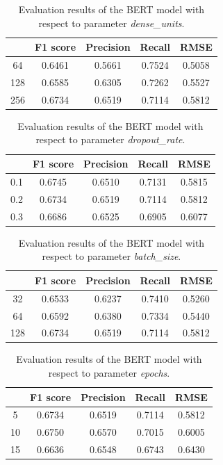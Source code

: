 \documentclass[11pt,a4paper]{article}
\begin{document}
\begin{table}[h]
\centering
\begin{tabular}{ccccc}
    & F1 score & Precision & Recall & RMSE   \\ \hline
64  & 0.6461   & 0.5661    & 0.7524 & 0.5058 \\
128 & 0.6585   & 0.6305    & 0.7262 & 0.5527 \\
256 & 0.6734   & 0.6519    & 0.7114 & 0.5812
\end{tabular}
\caption{Evaluation results of the BERT model with respect to parameter \textit{dense\_units}.}
\label{tab:bert-results-3}
\end{table}

\begin{table}[h]
\centering
\begin{tabular}{ccccc}
    & F1 score & Precision & Recall & RMSE   \\ \hline
0.1 & 0.6745   & 0.6510    & 0.7131 & 0.5815 \\
0.2 & 0.6734   & 0.6519    & 0.7114 & 0.5812 \\
0.3 & 0.6686   & 0.6525    & 0.6905 & 0.6077
\end{tabular}
\caption{Evaluation results of the BERT model with respect to parameter \textit{dropout\_rate}.}
\label{tab:bert-results-4}
\end{table}

\begin{table}[h]
\centering
\begin{tabular}{ccccc}
    & F1 score & Precision & Recall & RMSE   \\ \hline
32  & 0.6533   & 0.6237    & 0.7410 & 0.5260 \\
64  & 0.6592   & 0.6380    & 0.7334 & 0.5440 \\
128 & 0.6734   & 0.6519    & 0.7114 & 0.5812
\end{tabular}
\caption{Evaluation results of the BERT model with respect to parameter \textit{batch\_size}.}
\label{tab:bert-results-5}
\end{table}

\begin{table}[h]
\centering
\begin{tabular}{ccccc}
   & F1 score & Precision & Recall & RMSE   \\ \hline
5  & 0.6734   & 0.6519    & 0.7114 & 0.5812 \\
10 & 0.6750   & 0.6570    & 0.7015 & 0.6005 \\
15 & 0.6636   & 0.6548    & 0.6743 & 0.6430
\end{tabular}
\caption{Evaluation results of the BERT model with respect to parameter \textit{epochs}.}
\label{tab:bert-results-6}
\end{table}
\end{document}
